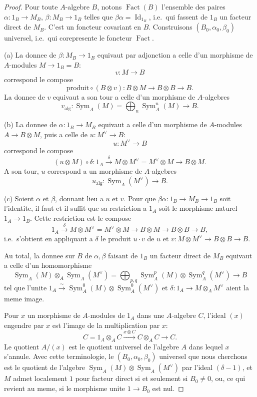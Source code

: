\documentclass[11pt,a4paper]{article}
\theoremstyle{plain}
\theoremstyle{definition}
\DeclareMathOperator{\Sym}{Sym}
\DeclareMathOperator{\Id}{Id}
\DeclareMathOperator{\Fact}{Fact}
\newcommand{\alg}{\mathrm{alg}}
\begin{document}
\begin{proof}
Pour toute $A$-algebre $B$, notons $\Fact(B)$ l'ensemble des paires $\alpha:1_B\to M_B$, $\beta:M_B\to1_B$ telles que $\beta\alpha=\Id_{1_B}$, i.e.~qui fassent de $1_B$ un facteur direct de $M_B$. C'est un foncteur covariant en $B$. Construisons $(B_0,\alpha_0,\beta_0)$ universel, i.e.~qui corepresente le foncteur $\Fact$.

(a) La donnee de $\beta:M_B\to1_B$ equivaut par adjonction a celle d'un morphisme de $A$-modules $M\to1_B=B$:
\[
v:M\to B
\]
correspond le compose
\[
\text{produit}\circ(B\otimes v):B\otimes M\to B\otimes B\to B.
\]
La donnee de $v$ equivaut a son tour a celle d'un morphisme de $A$-algebres
\[
v_{\alg}:\Sym_A(M)=\bigoplus_n\Sym^n_A(M)\to B.
\]

(b) La donnee de $\alpha:1_B\to M_B$ equivaut a celle d'un morphisme de $A$-modules $A\to B\otimes M$, puis a celle de $u:M^\vee\to B$:
\[
u:M^\vee\to B
\]
correspond le compose
\[
(u\otimes M)\circ\delta:1_A\xrightarrow{\delta}M\otimes M^\vee=M^\vee\otimes M\to B\otimes M.
\]
A son tour, $u$ correspond a un morphisme de $A$-algebres
\[
u_{\alg}:\Sym_A(M^\vee)\to B.
\]

(c) Soient $\alpha$ et $\beta$, donnant lieu a $u$ et $v$. Pour que $\beta\alpha:1_B\to M_B\to1_B$ soit l'identite, il faut et il suffit que sa restriction a $1_A$ soit le morphisme naturel $1_A\to1_B$. Cette restriction est le compose
\[
1_A\xrightarrow{\delta}M\otimes M^\vee=M^\vee\otimes M\to B\otimes M\to B\otimes B\to B,
\]
i.e.~s'obtient en appliquant a $\delta$ le produit $u\cdot v$ de $u$ et $v:M\otimes M^\vee\to B\otimes B\to B$.

Au total, la donnee sur $B$ de $\alpha,\beta$ faisant de $1_B$ un facteur direct de $M_B$ equivaut a celle d'un homomorphisme
\[
\Sym_A(M)\otimes_A\Sym_A(M^\vee)=\bigoplus_{p,q}\Sym^p_A(M)\otimes\Sym^q_A(M^\vee)\to B
\]
tel que l'unite $1_A\xrightarrow{\sim}\Sym^0_A(M)\otimes\Sym^0_A(M^\vee)$ et $\delta:1_A\to M\otimes_A M^\vee$ aient la meme image.

Pour $x$ un morphisme de $A$-modules de $1_A$ dans une $A$-algebre $C$, l'ideal $(x)$ engendre par $x$ est l'image de la multiplication par $x$:
\[
C=1_A\otimes_A C\xrightarrow{x\otimes C} C\otimes_A C\to C.
\]
Le quotient $A/(x)$ est le quotient universel de l'algebre $A$ dans lequel $x$ s'annule. Avec cette terminologie, le $(B_0,\alpha_0,\beta_0)$ universel que nous cherchons est le quotient de l'algebre $\Sym_A(M)\otimes\Sym_A(M^\vee)$ par l'ideal $(\delta-1)$, et $M$ admet localement $1$ pour facteur direct si et seulement si $B_0\neq0$, ou, ce qui revient au meme, si le morphisme unite $1\to B_0$ est nul.


\end{proof}
\end{document}
